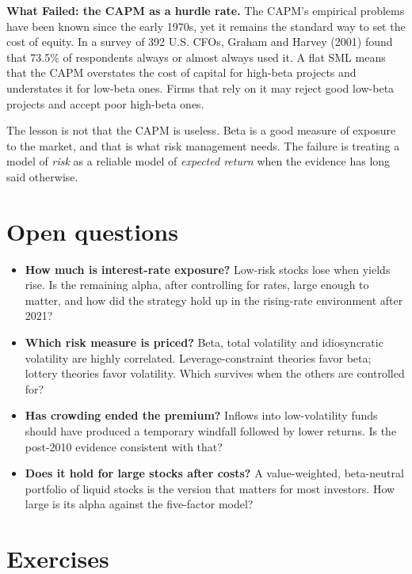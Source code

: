 \begin{callout}
\textbf{What Failed: the CAPM as a hurdle rate.} The CAPM's empirical problems have been known since the early 1970s, yet it remains the standard way to set the cost of equity. In a survey of 392 U.S. CFOs, Graham and Harvey (2001) found that 73.5\% of respondents always or almost always used it. A flat SML means that the CAPM overstates the cost of capital for high-beta projects and understates it for low-beta ones. Firms that rely on it may reject good low-beta projects and accept poor high-beta ones.

The lesson is not that the CAPM is useless. Beta is a good measure of exposure to the market, and that is what risk management needs. The failure is treating a model of \emph{risk} as a reliable model of \emph{expected return} when the evidence has long said otherwise.
\end{callout}

\section{Open questions}
\label{sec:12-open}

\begin{itemize}
  \item \textbf{How much is interest-rate exposure?} Low-risk stocks lose when yields rise. Is the remaining alpha, after controlling for rates, large enough to matter, and how did the strategy hold up in the rising-rate environment after 2021?
  \item \textbf{Which risk measure is priced?} Beta, total volatility and idiosyncratic volatility are highly correlated. Leverage-constraint theories favor beta; lottery theories favor volatility. Which survives when the others are controlled for?
  \item \textbf{Has crowding ended the premium?} Inflows into low-volatility funds should have produced a temporary windfall followed by lower returns. Is the post-2010 evidence consistent with that?
  \item \textbf{Does it hold for large stocks after costs?} A value-weighted, beta-neutral portfolio of liquid stocks is the version that matters for most investors. How large is its alpha against the five-factor model?
\end{itemize}

\section*{Exercises}

